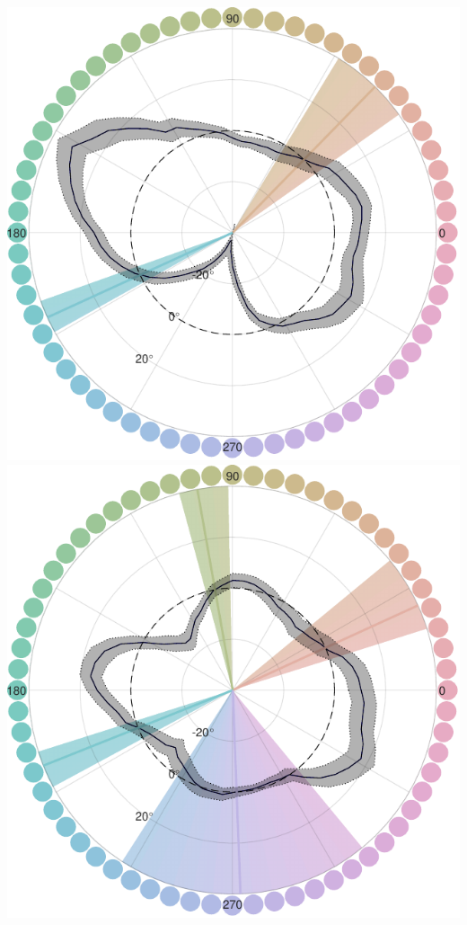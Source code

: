 \begin{minipage}{\textwidth}

\includegraphics[width=0.49\linewidth]{../../../Outputs/Paper/Figures/working/7_IndiData_MixMod/210422--211012_Pollux_categorybias2_230225.pdf}
\label{fig:BiasCurvesPollux}
\hfill
\includegraphics[width=0.49\linewidth]{../../../Outputs/Paper/Figures/working/7_IndiData_MixMod/210517--211108_Castor_categorybias2_230225.pdf}
\label{fig:BiasCurvesCastor}


\end{minipage}
